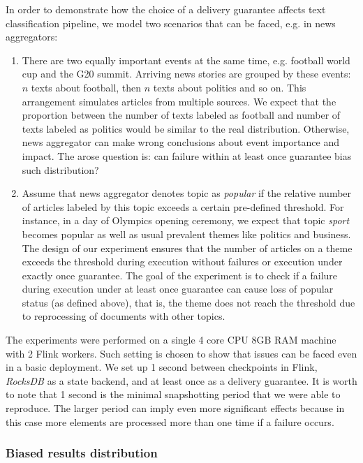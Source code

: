 In order to demonstrate how the choice of a delivery guarantee affects text classification pipeline, we model two scenarios that can be faced, e.g. in news aggregators:
\begin{enumerate}
    \item There are two equally important events at the same time, e.g. football world cup and the G20 summit. Arriving news stories are grouped by these events: $n$ texts about football, then $n$ texts about politics and so on. This arrangement simulates articles from multiple sources. We expect that the proportion between the number of texts labeled as football and number of texts labeled as politics would be similar to the real distribution. Otherwise, news aggregator can make wrong conclusions about event importance and impact. The arose question is: can failure within at least once guarantee bias such distribution?
    \item Assume that news aggregator denotes topic as {\em popular} if the relative number of articles labeled by this topic exceeds a certain pre-defined threshold. For instance, in a day of Olympics opening ceremony, we expect that topic {\em sport} becomes popular as well as usual prevalent themes like politics and business. The design of our experiment ensures that the number of articles on a theme exceeds the threshold during execution without failures or execution under exactly once guarantee. The goal of the experiment is to check if a failure during execution under at least once guarantee can cause loss of popular status (as defined above), that is, the theme does not reach the threshold due to reprocessing of documents with other topics. 
\end{enumerate}

The experiments were performed on a single 4 core CPU 8GB RAM machine with 2 Flink workers. Such setting is chosen to show that issues can be faced even in a basic deployment. We set up 1 second between checkpoints in Flink, {\em RocksDB} as a state backend, and at least once as a delivery guarantee. It is worth to note that 1 second is the minimal snapshotting period that we were able to reproduce. The larger period can imply even more significant effects because in this case more elements are processed more than one time if a failure occurs.

\subsubsection{Biased results distribution}

